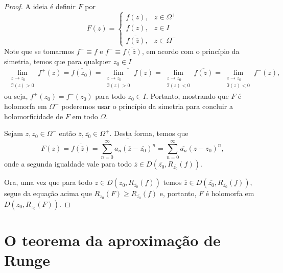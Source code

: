     \begin{proof}
        A ideia é definir $F$ por
        \begin{equation*}
            F(z) =
            \begin{cases}
                f(z), & z \in \Omega^+ \\
                f(z), & z \in I \\
                \overline{f(\overline{z})}, & z\in\Omega^-   
            \end{cases}
        \end{equation*}
        Note que se tomarmos $f^+ \equiv f$ e $f^- \equiv \overline{f(\overline{z})}$, 
        em acordo com o princípio da simetria, temos que para qualquer $z_0\in I$
        \begin{align*}
            \lim_{\substack{ z\to z_0 \\ \Im(z) > 0 }} f^+(z) 
            = 
            \overline{f(z_0)}
            =
            \overline{\lim_{\substack{ z\to z_0 \\ \Im(z) > 0 }} f(z)}
            =
            \lim_{\substack{ z\to z_0 \\ \Im(z) < 0 }} \overline{f(\overline{z})}
            =
            \lim_{\substack{ z\to z_0 \\ \Im(z) < 0 }} f^-(z),
        \end{align*}
        ou seja, $f^+(z_0) = f^-(z_0)$ para todo $z_0\in I$. Portanto, mostrando que 
        $F$ é holomorfa em $\Omega^-$ poderemos usar o princípio da simetria para 
        concluir a holomorficidade de $F$ em todo $\Omega$.
        
        Sejam $z, z_0\in\Omega^-$ então $\overline{z}, \overline{z_0}\in\Omega^+$. 
        Desta forma, temos que
        \begin{equation*}
            F(z) 
            = 
            \overline{f(\overline{z})} 
            =
            \overline{ \sum_{n=0}^{\infty}a_n(\overline{z} - \overline{z_0})^n }
            =
            \sum_{n=0}^{\infty}\overline{a_n}(z-z_0)^n,
        \end{equation*}
        onde a segunda igualdade vale para todo 
        $\overline{z}\in D(\overline{z_0}, R_{\overline{z_0}}(f))$.
        
        Ora, uma vez que para todo $z\in D(z_0, R_{\overline{z_0}}(f))$ temos
        $\overline{z}\in D(\overline{z_0}, R_{\overline{z_0}}(f))$, segue da equação acima
        que $R_{z_0}(F)\geq R_{\overline{z_0}}(f)$ e, portanto, $F$ é holomorfa em
        $D(z_0, R_{z_0}(F))$.
    \end{proof}
%

\section{O teorema da aproximação de Runge}
\label{sec:aprox-runge}
